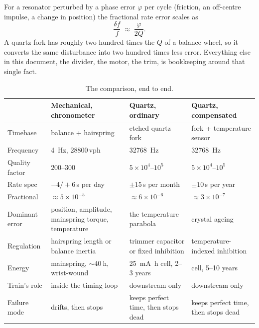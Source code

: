 \documentclass[11pt,a4paper]{article}
\begin{document}
For a resonator perturbed by a phase error $\varphi$ per cycle (friction, an off-centre
impulse, a change in position) the fractional rate error scales as
\begin{equation}
\frac{\delta f}{f} \;\approx\; \frac{\varphi}{2Q}.
\end{equation}
A quartz fork has roughly two hundred times the $Q$ of a balance wheel, so it converts the same
disturbance into two hundred times less error. Everything else in this document, the
divider, the motor, the trim, is bookkeeping around that single fact.

\begin{table}[htbp]
\centering
\caption{The comparison, end to end.}
\small
\begin{tabularx}{\textwidth}{@{}l>{\raggedright\arraybackslash}X>{\raggedright\arraybackslash}X>{\raggedright\arraybackslash}X@{}}
\toprule
 & \textbf{Mechanical, chronometer} & \textbf{Quartz, ordinary} & \textbf{Quartz, compensated} \\
\midrule
Timebase        & balance + hairspring & etched quartz fork & fork + temperature sensor \\
Frequency       & \SI{4}{\hertz}, \num{28800}\,vph & \SI{32768}{\hertz} & \SI{32768}{\hertz} \\
Quality factor  & \numrange{200}{300} & $5{\times}10^4$--$10^5$ & $5{\times}10^4$--$10^5$ \\
Rate spec       & $-4/+6$\,s per day & $\pm15$\,s per month & $\pm10$\,s per year \\
Fractional      & ${\approx}5{\times}10^{-5}$ & ${\approx}6{\times}10^{-6}$ & ${\approx}3{\times}10^{-7}$ \\
Dominant error  & position, amplitude, mainspring torque, temperature & the temperature parabola & crystal ageing \\
Regulation      & hairspring length or balance inertia & trimmer capacitor or fixed inhibition & temperature-indexed inhibition \\
Energy          & mainspring, ${\sim}\SI{40}{\hour}$, wrist-wound & \SI{25}{\milli\ampere\hour} cell, 2--3 years & cell, 5--10 years \\
Train's role    & inside the timing loop & downstream only & downstream only \\
Failure mode    & drifts, then stops & keeps perfect time, then stops dead & keeps perfect time, then stops dead \\
\bottomrule
\end{tabularx}
\end{table}
\end{document}
